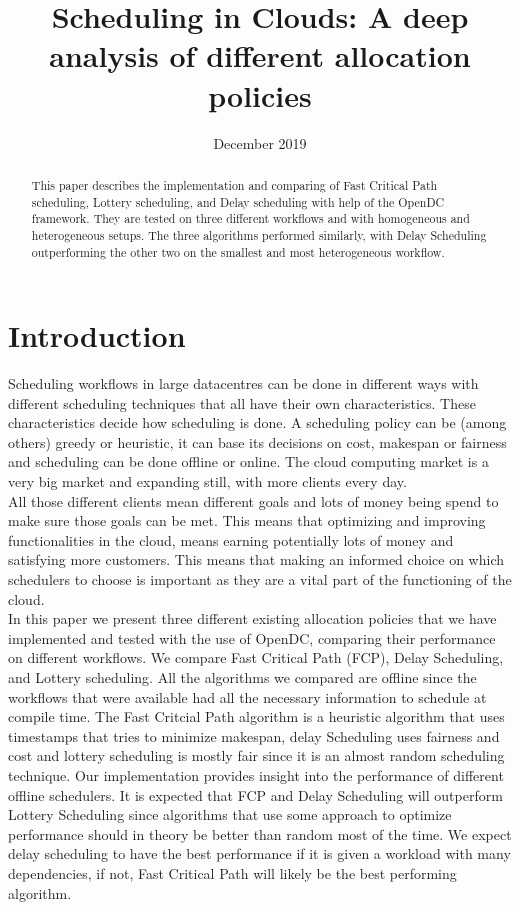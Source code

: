 \documentclass{article}
\title{Scheduling in Clouds: A deep analysis of different allocation policies}
\date{December 2019}
\begin{document}
\maketitle

\begin{abstract}
This paper describes the implementation and comparing of Fast Critical Path scheduling, Lottery scheduling, and Delay scheduling with help of the OpenDC framework. They are tested on three different workflows and with homogeneous and heterogeneous setups. The three algorithms performed similarly, with Delay Scheduling outperforming the other two on the smallest and most heterogeneous workflow.
\end{abstract}

\section{Introduction}
Scheduling workflows in large datacentres can be done in different ways with different scheduling techniques that all have their own characteristics. These characteristics decide how scheduling is done. A scheduling policy can be (among others) greedy or heuristic, it can base its decisions on cost, makespan or fairness and scheduling can be done offline or online. The cloud computing market is a very big market and expanding still, with more clients every day.\\
All those different clients mean different goals and lots of money being spend to make sure those goals can be met. This means that optimizing and improving functionalities in the cloud, means earning potentially lots of money and satisfying more customers. This means that making an informed choice on which schedulers to choose is important as they are a vital part of the functioning of the cloud. \\
In this paper we present three different existing allocation policies that we have implemented and tested with the use of OpenDC, comparing their performance on different workflows. We compare Fast Critical Path (FCP), Delay Scheduling, and Lottery scheduling. All the algorithms we compared are offline since the workflows that were available had all the necessary information to schedule at compile time. The Fast Critcial Path algorithm is a heuristic algorithm that uses timestamps that tries to minimize makespan, delay Scheduling uses fairness and cost and lottery scheduling is mostly fair since it is an almost random scheduling technique. Our implementation provides insight into the performance of different offline schedulers. It is expected that FCP and Delay Scheduling will outperform Lottery Scheduling since algorithms that use some approach to optimize performance should in theory be better than random most of the time. We expect delay scheduling to have the best performance if it is given a workload with many dependencies, if not, Fast Critical Path will likely be the best performing algorithm.
\end{document}
